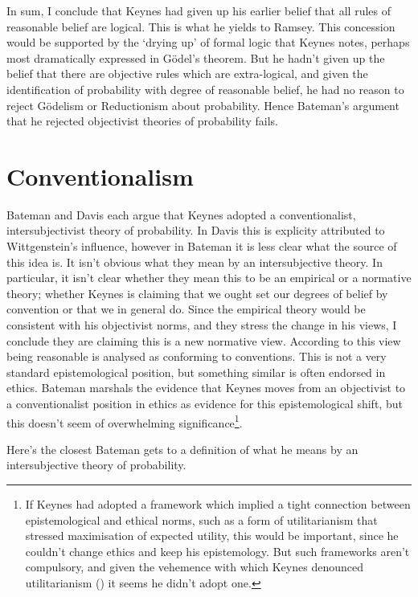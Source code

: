 \documentclass[
  10pt,
  letterpaper,
  DIV=11,
  numbers=noendperiod,
  twoside]{scrartcl}
\begin{document}
In sum, I conclude that Keynes had given up his earlier belief that all
rules of reasonable belief are logical. This is what he yields to
Ramsey. This concession would be supported by the `drying up' of formal
logic that Keynes notes, perhaps most dramatically expressed in Gödel's
theorem. But he hadn't given up the belief that there are objective
rules which are extra-logical, and given the identification of
probability with degree of reasonable belief, he had no reason to reject
Gödelism or Reductionism about probability. Hence Bateman's argument
that he rejected objectivist theories of probability fails.

\section{Conventionalism}\label{conventionalism}

Bateman and Davis each argue that Keynes adopted a conventionalist,
intersubjectivist theory of probability. In Davis this is explicity
attributed to Wittgenstein's influence, however in Bateman it is less
clear what the source of this idea is. It isn't obvious what they mean
by an intersubjective theory. In particular, it isn't clear whether they
mean this to be an empirical or a normative theory; whether Keynes is
claiming that we ought set our degrees of belief by convention or that
we in general do. Since the empirical theory would be consistent with
his objectivist norms, and they stress the change in his views, I
conclude they are claiming this is a new normative view. According to
this view being reasonable is analysed as conforming to conventions.
This is not a very standard epistemological position, but something
similar is often endorsed in ethics. Bateman marshals the evidence that
Keynes moves from an objectivist to a conventionalist position in ethics
as evidence for this epistemological shift, but this doesn't seem of
overwhelming significance\footnote{If Keynes had adopted a framework
  which implied a tight connection between epistemological and ethical
  norms, such as a form of utilitarianism that stressed maximisation of
  expected utility, this would be important, since he couldn't change
  ethics and keep his epistemology. But such frameworks aren't
  compulsory, and given the vehemence with which Keynes denounced
  utilitarianism () it seems
  he didn't adopt one.}.

Here's the closest Bateman gets to a definition of what he means by an
intersubjective theory of probability.
\end{document}
